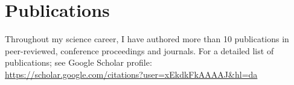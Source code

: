 \section{Publications}
Throughout my science career, I have authored more than 10 publications in peer-reviewed, conference proceedings and journals. For a detailed list of publications; see Google Scholar profile:\\ 
\href{https://scholar.google.com/citations?user=xEkdkFkAAAAJ&hl=da}{https://scholar.google.com/citations?user=xEkdkFkAAAAJ&hl=da}